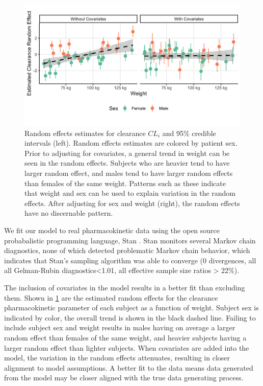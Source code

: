 \begin{figure}
	\centering
	\includegraphics[width=\linewidth]{"figures/random_effects_change.png"}
	\caption{Random effects estimates for clearance $ CL_i $ and 95\% credible intervals (left).  Random effects estimates are colored by patient sex.  Prior to adjusting for covariates, a general trend in weight can be seen in the random effects.  Subjects who are heavier tend to have larger random effect, and males tend to have larger random effects than females of the same weight.  Patterns such as these indicate that weight and sex can be used to explain variation in the random effects.  After adjusting for sex and weight (right), the random effects have no discernable pattern.}
	\label{fig:randomeffectschange}
\end{figure}

We fit our model to real pharmacokinetic data using the open source probabalistic programming language, Stan \cite{gelman2015stan}.  Stan monitors several Markov chain diagnostics, none of which detected problematic Markov chain behavior, which indicates that Stan’s sampling algorithm was able to converge (0 divergences, all all Gelman-Rubin diagnostics<1.01, all effective sample size ratios  > 22\%).  

The inclusion of covariates in the model results in a better fit than excluding them. Shown in \cref{fig:randomeffectschange} are the estimated random effects for the clearance pharmacokinetic parameter of each subject as a function of weight.  Subject sex is indicated by color, the overall trend is shown in the black dashed line.  Failing to include subject sex and weight results in males having on average a larger random effect than females of the same weight, and heavier subjects having a larger random effect than lighter subjects.  When covariates are added into the model, the variation in the random effects attenuates, resulting in closer alignment to model assumptions. A better fit to the data means data generated from the model may be closer aligned with the true data generating process.

